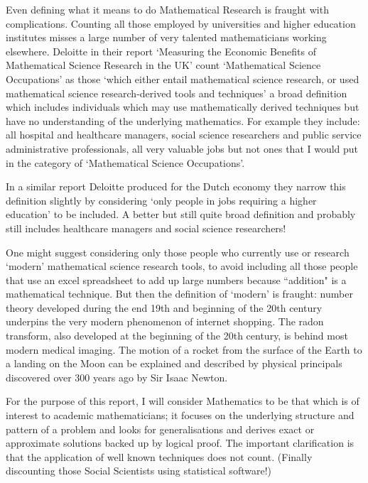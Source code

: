 \documentclass[11pt]{article} %
\begin{document}
	Even defining what it means to do Mathematical Research is fraught with complications. Counting all those employed by universities and higher education institutes misses a large number of very talented mathematicians working elsewhere. 	Deloitte in their report `Measuring the Economic Benefits of Mathematical Science Research in the UK' \cite{deloitteuk} count `Mathematical Science Occupations' as those `which either entail mathematical science research, or used mathematical science research-derived tools and techniques' a broad definition which includes individuals which may use mathematically derived techniques but have no understanding of the underlying mathematics. For example they include: all hospital and healthcare managers, social science researchers and public service administrative professionals, all very valuable jobs but not ones that I would put in the category of `Mathematical Science Occupations'. 
	
	
	In a similar report Deloitte produced for the Dutch economy \cite{deloitteNL} they narrow this definition slightly by considering `only people in jobs requiring a higher education' to be included.  A better but still quite broad definition and probably still includes healthcare managers and social science researchers!
	
	
	One might suggest considering only those people who currently use or research `modern' mathematical science research tools, to avoid including all those people that use an excel spreadsheet to add up large numbers because ``addition" is a mathematical technique. But then the definition of `modern' is fraught: number theory developed during the end 19th and beginning of the 20th century underpins the very modern phenomenon of internet shopping. The radon transform, also developed at the beginning of the 20th century, is behind most modern medical imaging. The motion of a rocket from the surface of the Earth to a landing on the Moon can be explained and described by physical principals discovered over 300 years ago by Sir Isaac Newton.
	
	
	For the purpose of this report, I  will consider Mathematics to be that which is of interest to academic mathematicians; it focuses  on the underlying structure and pattern of a problem and  looks for generalisations and derives exact or approximate solutions backed up by logical proof. The important clarification is that the application of well known techniques does not count. (Finally discounting those Social Scientists using statistical software!)
	
\end{document}
